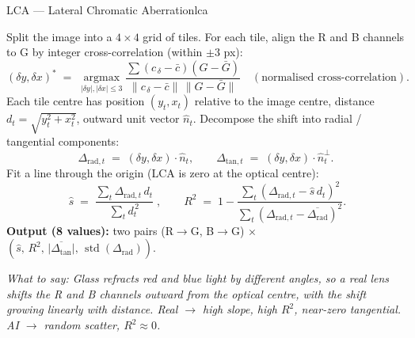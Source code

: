 \documentclass[12pt]{article}
\newcommand{\say}[1]{\par\smallskip\textit{\small \textcolor{black!60}{What to say:} #1}}
\begin{document}
\bigskip
\begin{lensbox}{LCA --- Lateral Chromatic Aberration}{lca}

Split the image into a $4{\times}4$ grid of tiles. For each tile, align
the R and B channels to G by integer cross-correlation (within $\pm 3$ px):
\[
(\delta y,\delta x)^{*}
\;=\;\operatorname*{argmax}_{|\delta y|,|\delta x|\le 3}
\frac{\sum (c_{\,\delta}-\bar c)(G-\bar G)}{\|c_{\,\delta}-\bar c\|\,\|G-\bar G\|}
\quad (\text{normalised cross-correlation}).
\]
Each tile centre has position $(y_t,x_t)$ relative to the image centre,
distance $d_t=\sqrt{y_t^{2}+x_t^{2}}$, outward unit vector $\hat n_t$.
Decompose the shift into radial / tangential components:
\[
\Delta_{\text{rad},t} \;=\; (\delta y,\delta x)\!\cdot\!\hat n_t,
\qquad
\Delta_{\text{tan},t} \;=\; (\delta y,\delta x)\!\cdot\!\hat n_t^{\perp}.
\]
Fit a line through the origin (LCA is zero at the optical centre):
\[
\boxed{\;
\hat s \;=\; \frac{\sum_t \Delta_{\text{rad},t}\,d_t}{\sum_t d_t^{\,2}}\;},
\qquad
R^{2} \;=\; 1-\frac{\sum_t(\Delta_{\text{rad},t}-\hat s\, d_t)^{2}}
                   {\sum_t(\Delta_{\text{rad},t}-\overline{\Delta_{\text{rad}}})^{2}}.
\]
\textbf{Output (8 values):} two pairs (R$\to$G, B$\to$G) $\times$
$(\hat s,\, R^{2},\, \overline{|\Delta_{\text{tan}}|},\, \operatorname{std}(\Delta_{\text{rad}}))$.

\say{Glass refracts red and blue light by different angles, so a real
lens shifts the R and B channels outward from the optical centre, with
the shift growing \emph{linearly} with distance. Real $\to$ high slope,
high $R^{2}$, near-zero tangential. AI $\to$ random scatter, $R^{2}\!\approx\!0$.}
\end{lensbox}

\bigskip

\begin{center}
\end{center}
\end{document}

